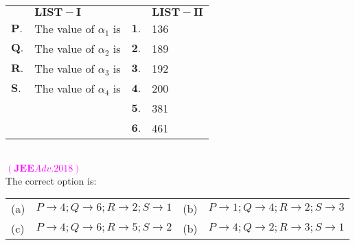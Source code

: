 \documentclass[journal,12pt,twocolumn]{IEEEtran}
\theoremstyle{remark}
\begin{document}
\begin{tabular}{p{1cm}p{9cm}p{1cm}p{4cm}}
     &  $\mathbf{LIST-I}$ & & $\mathbf{LIST-II}$\\
    $\mathbf{P.}$  & The value of $\alpha_1$ is & $\mathbf{1.}$ & 136\\
    $\mathbf{Q.}$ & The value of $\alpha_2$ is & $\mathbf{2.}$&189\\
    $\mathbf{R.}$ & The value of $\alpha_3$ is & $\mathbf{3.}$&192\\
    $\mathbf{S.}$ & The value of $\alpha_4$ is & $\mathbf{4.}$&200\\
    & & $\mathbf{5.}$&381\\
    & & $\mathbf{6.}$&461\\
    
\end{tabular}\\

\hfill \textcolor{magenta}{$(\mathbf{JEE} Adv. 2018)$}\\
The correct option is:\\
\begin{tabular}{p{0.5cm}p{10cm}p{0.5cm}p{6cm}}
    (a) & $P \to4; Q\to6; R\to2; S\to 1$ & (b) & $P \to1; Q\to4; R\to2; S\to 3$ \\
     (c)& $P \to4; Q\to6; R\to5; S\to 2$ & (b) & $P \to4; Q\to2; R\to3; S\to 1$ 
\end{tabular}\\
\end{document}
